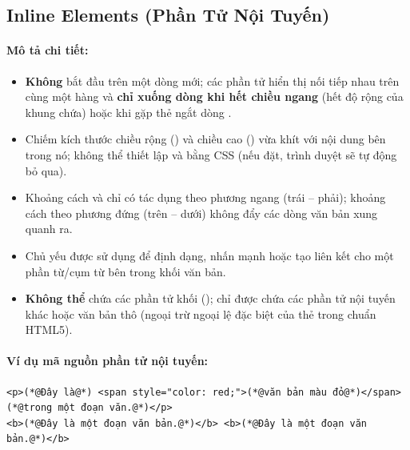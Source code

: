\subsection{Inline Elements (Phần Tử Nội Tuyến)}

\paragraph{Mô tả chi tiết:}
\begin{itemize}[leftmargin=1.8em, itemsep=3pt, parsep=0pt]
    \item \textbf{Không} bắt đầu trên một dòng mới; các phần tử hiển thị nối tiếp nhau trên cùng một hàng và \textbf{chỉ xuống dòng khi hết chiều ngang} (hết độ rộng của khung chứa) hoặc khi gặp thẻ ngắt dòng .
    \item Chiếm kích thước chiều rộng () và chiều cao () vừa khít với nội dung bên trong nó; không thể thiết lập  và  bằng CSS (nếu đặt, trình duyệt sẽ tự động bỏ qua).
    \item Khoảng cách  và  chỉ có tác dụng theo phương ngang (trái -- phải); khoảng cách theo phương đứng (trên -- dưới) không đẩy các dòng văn bản xung quanh ra.
    \item Chủ yếu được sử dụng để định dạng, nhấn mạnh hoặc tạo liên kết cho một phần từ/cụm từ bên trong khối văn bản.
    \item \textbf{Không thể} chứa các phần tử khối (); chỉ được chứa các phần tử nội tuyến khác hoặc văn bản thô (ngoại trừ ngoại lệ đặc biệt của thẻ  trong chuẩn HTML5).
\end{itemize}

\paragraph{Ví dụ mã nguồn phần tử nội tuyến:}
\begin{codeWindow}
\begin{lstlisting}[language=HTML5]
<p>(*@Đây là@*) <span style="color: red;">(*@văn bản màu đỏ@*)</span> (*@trong một đoạn văn.@*)</p>
<b>(*@Đây là một đoạn văn bản.@*)</b> <b>(*@Đây là một đoạn văn bản.@*)</b>
\end{lstlisting}
\end{codeWindow}

